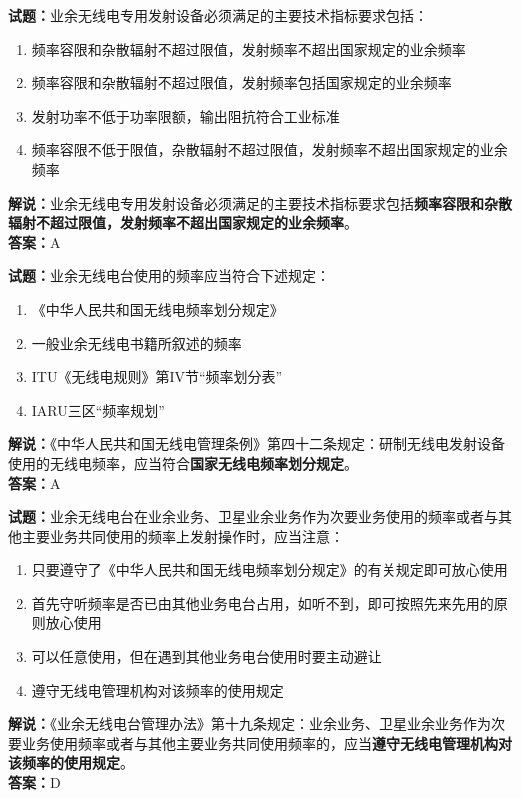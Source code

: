 \documentclass{ctexbook}
\begin{document}
\bigskip


\noindent\textbf{试题：}业余无线电专用发射设备必须满足的主要技术指标要求包括：
\begin{enumerate}[leftmargin=3em]
	\item 频率容限和杂散辐射不超过限值，发射频率不超出国家规定的业余频率
	\item 频率容限和杂散辐射不超过限值，发射频率包括国家规定的业余频率
	\item 发射功率不低于功率限额，输出阻抗符合工业标准
	\item 频率容限不低于限值，杂散辐射不超过限值，发射频率不超出国家规定的业余频率
\end{enumerate}
\noindent\textbf{解说：}业余无线电专用发射设备必须满足的主要技术指标要求包括\textbf{频率容限和杂散辐射不超过限值，发射频率不超出国家规定的业余频率}。\\\noindent\textbf{答案：}A




\bigskip


\noindent\textbf{试题：}业余无线电台使用的频率应当符合下述规定：
\begin{enumerate}[leftmargin=3em]
	\item 《中华人民共和国无线电频率划分规定》
	\item 一般业余无线电书籍所叙述的频率
	\item ITU《无线电规则》第IV节“频率划分表”
	\item IARU三区“频率规划”
\end{enumerate}
\noindent\textbf{解说：}《中华人民共和国无线电管理条例》第四十二条规定：研制无线电发射设备使用的无线电频率，应当符合\textbf{国家无线电频率划分规定}。\\\noindent\textbf{答案：}A




\bigskip


\noindent\textbf{试题：}业余无线电台在业余业务、卫星业余业务作为次要业务使用的频率或者与其他主要业务共同使用的频率上发射操作时，应当注意：
\begin{enumerate}[leftmargin=3em]
	\item 只要遵守了《中华人民共和国无线电频率划分规定》的有关规定即可放心使用
	\item 首先守听频率是否已由其他业务电台占用，如听不到，即可按照先来先用的原则放心使用
	\item 可以任意使用，但在遇到其他业务电台使用时要主动避让
	\item 遵守无线电管理机构对该频率的使用规定
\end{enumerate}
\noindent\textbf{解说：}《业余无线电台管理办法》第十九条规定：业余业务、卫星业余业务作为次要业务使用频率或者与其他主要业务共同使用频率的，应当\textbf{遵守无线电管理机构对该频率的使用规定}。\\\noindent\textbf{答案：}D
\end{document}
